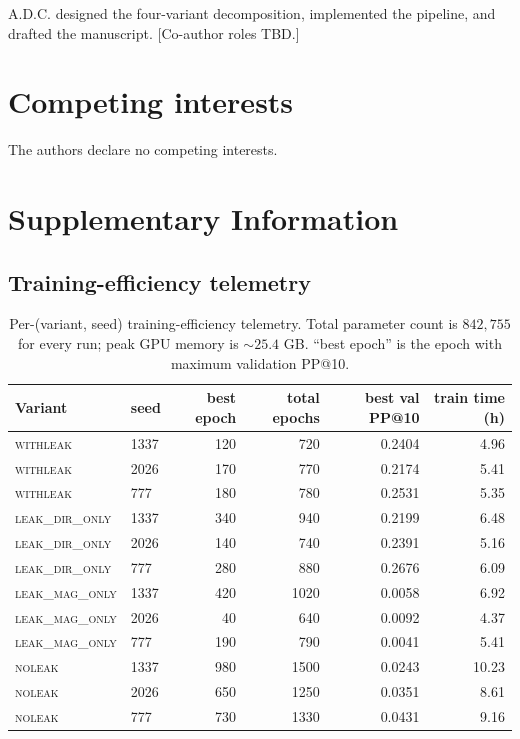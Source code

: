 \documentclass[10pt,a4paper]{article}
\newcommand{\withleak}{\textsc{withleak}}
\newcommand{\dironly}{\textsc{leak\_dir\_only}}
\newcommand{\magonly}{\textsc{leak\_mag\_only}}
\newcommand{\noleak}{\textsc{noleak}}
\begin{document}
A.D.C. designed the four-variant decomposition, implemented the
pipeline, and drafted the manuscript. [Co-author roles TBD.]

\section*{Competing interests}

The authors declare no competing interests.




\clearpage
\appendix
\section*{Supplementary Information}

\subsection*{Training-efficiency telemetry}
\label{sec:efficiency}

\begin{table}[h]
\small
\centering
\caption{Per-(variant, seed) training-efficiency telemetry. Total
parameter count is $842{,}755$ for every run; peak GPU memory is
$\sim\!25.4$ GB. ``best epoch'' is the epoch with maximum
validation PP@10.}
\label{tab:efficiency}
\begin{tabular}{llrrrr}
\toprule
Variant & seed & best epoch & total epochs & best val PP@10 & train time (h) \\
\midrule
\withleak{}  & 1337 & 120 & 720  & 0.2404 & 4.96 \\
\withleak{}  & 2026 & 170 & 770  & 0.2174 & 5.41 \\
\withleak{}  & 777  & 180 & 780  & 0.2531 & 5.35 \\
\dironly{}   & 1337 & 340 & 940  & 0.2199 & 6.48 \\
\dironly{}   & 2026 & 140 & 740  & 0.2391 & 5.16 \\
\dironly{}   & 777  & 280 & 880  & 0.2676 & 6.09 \\
\magonly{}   & 1337 & 420 & 1020 & 0.0058 & 6.92 \\
\magonly{}   & 2026 &  40 & 640  & 0.0092 & 4.37 \\
\magonly{}   & 777  & 190 & 790  & 0.0041 & 5.41 \\
\noleak{}    & 1337 & 980 & 1500 & 0.0243 & 10.23 \\
\noleak{}    & 2026 & 650 & 1250 & 0.0351 & 8.61  \\
\noleak{}    & 777  & 730 & 1330 & 0.0431 & 9.16  \\
\bottomrule
\end{tabular}
\end{table}
\end{document}
